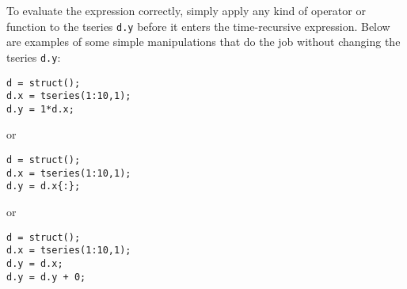 To evaluate the expression correctly, simply apply any kind of operator
or function to the tseries \texttt{d.y} before it enters the
time-recursive expression. Below are examples of some simple
manipulations that do the job without changing the tseries \texttt{d.y}:

\begin{verbatim}
d = struct();
d.x = tseries(1:10,1);
d.y = 1*d.x;
\end{verbatim}

or

\begin{verbatim}
d = struct();
d.x = tseries(1:10,1);
d.y = d.x{:};
\end{verbatim}

or

\begin{verbatim}
d = struct();
d.x = tseries(1:10,1);
d.y = d.x;
d.y = d.y + 0;
\end{verbatim}




